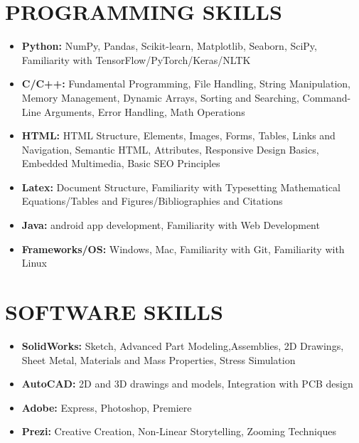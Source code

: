 \documentclass[letterpaper,11pt]{article}
\newcommand{\resumeSubHeadingListStart}{\begin{itemize}[leftmargin=*]}
\newcommand{\resumeSubHeadingListEnd}{\end{itemize}}
\begin{document}
\section{PROGRAMMING SKILLS}
    \resumeSubHeadingListStart
        \item{
            \textbf{Python: }{NumPy, Pandas, Scikit-learn, Matplotlib, Seaborn, SciPy,  Familiarity with TensorFlow/PyTorch/Keras/NLTK}
        }\vspace{-5pt}
        \item{
            \textbf{C/C++: }{Fundamental Programming, File Handling, String Manipulation, Memory Management, Dynamic Arrays, Sorting and Searching, Command-Line Arguments, Error Handling, Math Operations}
        }\vspace{-5pt}
        \item{
            \textbf{HTML: }{HTML Structure, Elements, Images, Forms, Tables, Links and Navigation, Semantic HTML, Attributes, Responsive Design Basics, Embedded Multimedia, Basic SEO Principles}
        }\vspace{-5pt}
        \item{
            \textbf{Latex: }{Document Structure, Familiarity with Typesetting Mathematical Equations/Tables and Figures/Bibliographies and Citations}
        }\vspace{-5pt}
        \item{
            \textbf{Java: }{android app development, Familiarity with Web Development}
        }\vspace{-5pt}
        \item{
            \textbf{Frameworks/OS: }{Windows, Mac, Familiarity with Git, Familiarity with Linux}
        }
    \resumeSubHeadingListEnd

\section{SOFTWARE SKILLS}
    \resumeSubHeadingListStart
        \item{
            \textbf{SolidWorks: }{Sketch, Advanced Part Modeling,Assemblies, 2D Drawings, Sheet Metal, Materials and Mass Properties, Stress Simulation}
        }\vspace{-5pt}
        \item{
            \textbf{AutoCAD: }{2D and 3D drawings and models, Integration with PCB design} 
        }\vspace{-5pt}
        \item{
            \textbf{Adobe: }{Express, Photoshop, Premiere}
        }\vspace{-5pt}
        \item{
            \textbf{Prezi: }{Creative Creation, Non-Linear Storytelling, Zooming Techniques}
        }
    \resumeSubHeadingListEnd
    
\end{document}
